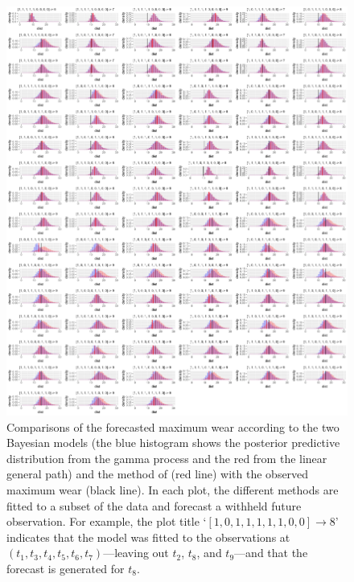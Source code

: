 \begin{figure}
  \centering
  \includegraphics[width=\textwidth]{figures/ch-6/test.png}
  \caption{Comparisons of the forecasted maximum wear according to the two Bayesian models (the blue histogram shows the posterior predictive distribution from the gamma process and the red from the linear general path) and the method of \citet{webb_2020} (red line) with the observed maximum wear (black line). In each plot, the different methods are fitted to a subset of the data and forecast a withheld future observation. For example, the plot title `$[1, 0, 1, 1, 1, 1, 1, 0, 0] \rightarrow 8$' indicates that the model was fitted to the observations at $(t_1, t_3, t_4, t_5, t_6, t_7)$---leaving out $t_2$, $t_8$, and $t_9$---and that the forecast is generated for $t_8$.}
  \label{fig:beltwear-resampling}
\end{figure}

